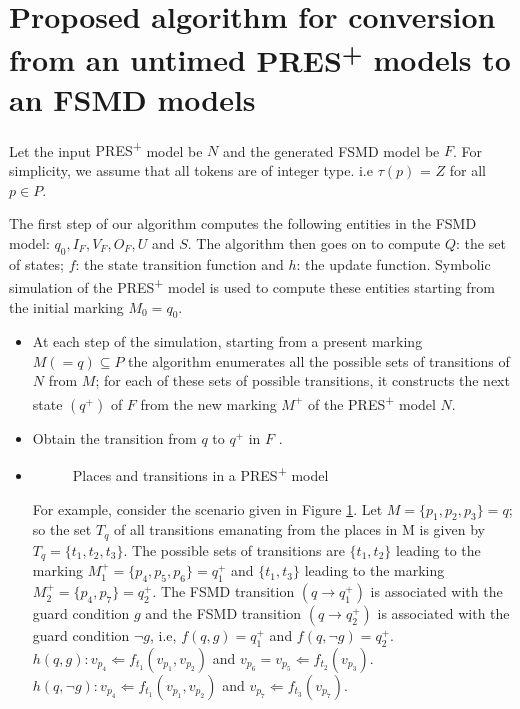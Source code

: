 \documentclass[9pt,executive]{article}
\def\presp{PRES\textsuperscript{+}}
\def\fsmd{FSMD}
\def\presp{PRES\textsuperscript{+}}
\def\fsmd{FSMD}
\begin{document}
\section{Proposed algorithm for conversion from an untimed {\presp} models to an {\fsmd} models}\label{algorithm}
 Let the input {\presp} model be $N$ and the generated {\fsmd} model be $F$. For simplicity, we assume that all tokens are of integer type. i.e $\tau (p)$ = $Z$ for all $p \in P$.

The first step of our algorithm computes the following entities in the {\fsmd} model:  $q_0, I_F, V_F, O_F, U$ and $S$.
 The algorithm then goes on to compute $Q$: the set of states; $f$: the state transition function and $h$: the update function. Symbolic simulation of the {\presp} model is used to compute these entities starting from the initial marking $M_0 = q_0$.
\begin{itemize}
 
 \item 
At each step of the simulation, starting from a present marking $M (= q) \subseteq
P$ the algorithm enumerates all the possible sets of transitions of $N$ from $M$; for
each of these sets of possible transitions, it constructs the next state $(q^+)$ of $F$
from the new marking $M^+$ of the {\presp} model $N$.
 \item 
 Obtain the transition from $q$ to $q^+$ in $F$ .     
 \item
 \begin{figure}[htbp]
\centerline{}
\caption{Places and transitions in a {\presp} model}
\label{fig:guards}
\end{figure}
For example, consider the scenario given in Figure \ref{fig:guards}. Let $M = \{p_1, p_2, p_3\} = q$; so the set $T_q$ of all transitions emanating from the places in M is given by $T_q = \{t_1, t_2, t_3\}$. The possible sets of transitions are $\{t_1, t_2\}$ leading to the marking $M_1^{+} = \{p_4, p_5, p_6\} = q_1^{+}$ and $\{t_1, t_3\}$ leading to the marking $M_2^{+} = \{p_4, p_7\} = q_2^{+}$. The {\fsmd} transition $(q \rightarrow q_1^{+})$ is associated with the guard condition $g$ and the {\fsmd} transition $(q \rightarrow q_2^{+})$ is associated with the guard condition $\neg g$, i.e, $f(q, g) = q_1^{+}$ and $f(q, \neg g) = q_2^{+}$. $h(q, g) : v_{p_4} \Leftarrow f_{t_1} (v_{p_1}, v_{p_2})$ and $v_{p_6} = v_{p_5} \Leftarrow f_{t_2}(v_{p_3})$. $h(q, \neg g) : v_{p_4} \Leftarrow f_{t_1} (v_{p_1}, v_{p_2})$ and $v_{p_7} \Leftarrow f_{t_3}(v_{p_7})$. 
 








 \end{itemize}
\end{document}
